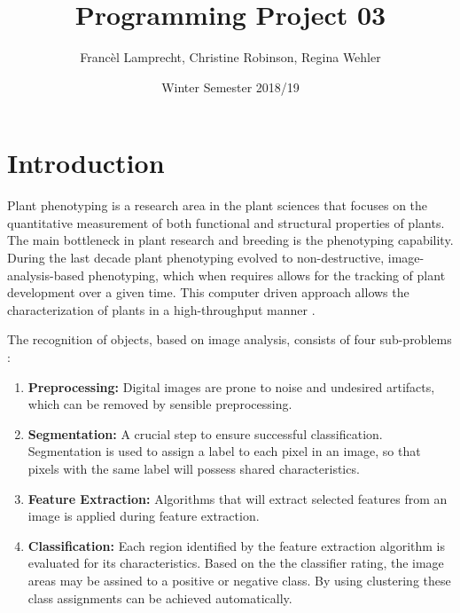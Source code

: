 \documentclass[paper=A4,bibliography=totocnumbered]{scrartcl}
\title{Programming Project 03}
\author{Francèl Lamprecht, Christine Robinson, Regina Wehler}
\date{Winter Semester 2018/19}
\begin{document}
\maketitle

\tableofcontents
\clearpage
\section{Introduction}
Plant phenotyping is a research  area in the plant sciences that focuses on the quantitative measurement of both functional and structural properties of plants. The main bottleneck in plant research and breeding is the phenotyping capability. During the last decade plant phenotyping evolved to non-destructive, image-analysis-based phenotyping, which when requires allows for the tracking of plant development over a given time. This computer driven approach allows the characterization of plants in a high-throughput manner \citep{Walter.2015}.

The recognition of objects, based on image analysis, consists of four sub-problems \citep{Adams.2018}: 
\begin{enumerate}
\item \textbf{Preprocessing:} Digital images are prone to noise and undesired artifacts, which can be removed by sensible preprocessing. 
\item \textbf{Segmentation:}  A crucial step to ensure successful classification. Segmentation is used to assign a label to each pixel in an image, so that pixels with the same label will possess shared characteristics. 
\item \textbf{Feature Extraction:}  Algorithms that will extract selected features from an image is applied during feature extraction. 
\item \textbf{Classification:}  Each region identified by the feature extraction algorithm is evaluated for its characteristics. Based on the the classifier rating, the image areas may be assined to  a positive or negative class. By using clustering these class assignments can be achieved automatically. 
\end{enumerate}

\end{document}

